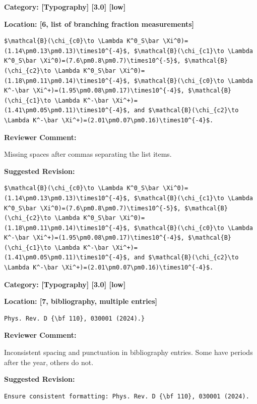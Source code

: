 \documentclass[12pt]{article}
\begin{document}
\begin{reviewer}
\noindent \textbf{Category: [Typography] [3.0] [low]}

\noindent \textbf{Location: [6, list of branching fraction measurements]}

\begin{lstlisting}[breaklines=true]
	$\mathcal{B}(\chi_{c0}\to \Lambda K^0_S\bar \Xi^0)=(1.14\pm0.13\pm0.13)\times10^{-4}$, $\mathcal{B}(\chi_{c1}\to \Lambda K^0_S\bar \Xi^0)=(7.6\pm0.8\pm0.7)\times10^{-5}$, $\mathcal{B}(\chi_{c2}\to \Lambda K^0_S\bar \Xi^0)=(1.18\pm0.11\pm0.14)\times10^{-4}$, $\mathcal{B}(\chi_{c0}\to \Lambda K^-\bar \Xi^+)=(1.95\pm0.08\pm0.17)\times10^{-4}$, $\mathcal{B}(\chi_{c1}\to \Lambda K^-\bar \Xi^+)=(1.41\pm0.05\pm0.11)\times10^{-4}$, and $\mathcal{B}(\chi_{c2}\to \Lambda K^-\bar \Xi^+)=(2.01\pm0.07\pm0.16)\times10^{-4}$.
\end{lstlisting}

\textbf{Reviewer Comment:}

Missing spaces after commas separating the list items.

\textbf{Suggested Revision:}

\begin{lstlisting}[breaklines=true]
	$\mathcal{B}(\chi_{c0}\to \Lambda K^0_S\bar \Xi^0)=(1.14\pm0.13\pm0.13)\times10^{-4}$, $\mathcal{B}(\chi_{c1}\to \Lambda K^0_S\bar \Xi^0)=(7.6\pm0.8\pm0.7)\times10^{-5}$, $\mathcal{B}(\chi_{c2}\to \Lambda K^0_S\bar \Xi^0)=(1.18\pm0.11\pm0.14)\times10^{-4}$, $\mathcal{B}(\chi_{c0}\to \Lambda K^-\bar \Xi^+)=(1.95\pm0.08\pm0.17)\times10^{-4}$, $\mathcal{B}(\chi_{c1}\to \Lambda K^-\bar \Xi^+)=(1.41\pm0.05\pm0.11)\times10^{-4}$, and $\mathcal{B}(\chi_{c2}\to \Lambda K^-\bar \Xi^+)=(2.01\pm0.07\pm0.16)\times10^{-4}$.
\end{lstlisting}

\end{reviewer}

\begin{reviewer}
\noindent \textbf{Category: [Typography] [3.0] [low]}

\noindent \textbf{Location: [7, bibliography, multiple entries]}

\begin{lstlisting}[breaklines=true]
	Phys. Rev. D {\bf 110}, 030001 (2024).}
\end{lstlisting}

\textbf{Reviewer Comment:}

Inconsistent spacing and punctuation in bibliography entries. Some have periods after the year, others do not.

\textbf{Suggested Revision:}

\begin{lstlisting}[breaklines=true]
	Ensure consistent formatting: Phys. Rev. D {\bf 110}, 030001 (2024).
\end{lstlisting}

\end{reviewer}
\end{document}

